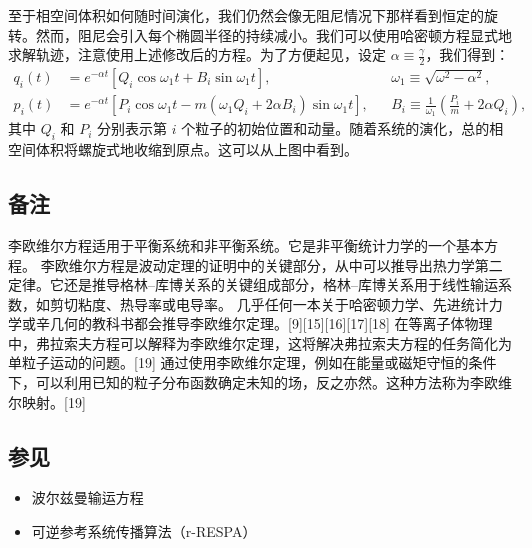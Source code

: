 至于相空间体积如何随时间演化，我们仍然会像无阻尼情况下那样看到恒定的旋转。然而，阻尼会引入每个椭圆半径的持续减小。我们可以使用哈密顿方程显式地求解轨迹，注意使用上述修改后的方程。为了方便起见，设定 \( \alpha \equiv \frac{\gamma}{2} \)，我们得到：
\[
\begin{aligned}
q_i(t) &= e^{-\alpha t} \left[ Q_i \cos \omega_1 t + B_i \sin \omega_1 t \right], && \omega_1 \equiv \sqrt{\omega^2 - \alpha^2}, \\
p_i(t) &= e^{-\alpha t} \left[ P_i \cos \omega_1 t - m(\omega_1 Q_i + 2 \alpha B_i) \sin \omega_1 t \right], && B_i \equiv \frac{1}{\omega_1} \left( \frac{P_i}{m} + 2 \alpha Q_i \right),
\end{aligned}~
\]
其中 \( Q_i \) 和 \( P_i \) 分别表示第 \( i \) 个粒子的初始位置和动量。随着系统的演化，总的相空间体积将螺旋式地收缩到原点。这可以从上图中看到。
\subsection{备注}  
李欧维尔方程适用于平衡系统和非平衡系统。它是非平衡统计力学的一个基本方程。  
李欧维尔方程是波动定理的证明中的关键部分，从中可以推导出热力学第二定律。它还是推导格林–库博关系的关键组成部分，格林–库博关系用于线性输运系数，如剪切粘度、热导率或电导率。  
几乎任何一本关于哈密顿力学、先进统计力学或辛几何的教科书都会推导李欧维尔定理。[9][15][16][17][18]  
在等离子体物理中，弗拉索夫方程可以解释为李欧维尔定理，这将解决弗拉索夫方程的任务简化为单粒子运动的问题。[19] 通过使用李欧维尔定理，例如在能量或磁矩守恒的条件下，可以利用已知的粒子分布函数确定未知的场，反之亦然。这种方法称为李欧维尔映射。[19]
\subsection{参见}  
\begin{itemize}
\item 波尔兹曼输运方程  
\item 可逆参考系统传播算法（r-RESPA）
\end{itemize}
